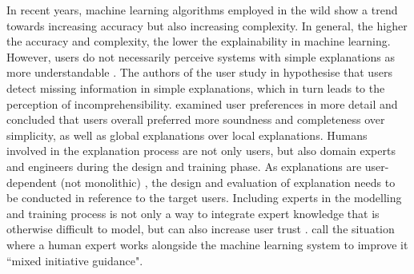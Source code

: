 In recent years, machine learning algorithms employed in the wild show a trend towards increasing accuracy but also increasing complexity. In general, the higher the accuracy and complexity, the lower the explainability \cite{richardson2018survey} \cite{chen2018learning} in machine learning. However, users do not necessarily perceive systems with simple explanations as more understandable \cite{allahyari2011user}. The authors of the user study in \cite{allahyari2011user} hypothesise that users detect missing information in simple explanations, which in turn leads to the perception of incomprehensibility. \cite{van2018contrastive} examined user preferences in more detail and concluded that users overall preferred more soundness and completeness over simplicity, as well as global explanations over local explanations.\newline
Humans involved in the explanation process are not only users, but also domain experts and engineers during the design and training phase. As explanations are user-dependent (not monolithic) \cite{preece2018asking}, the design and evaluation of explanation needs to be conducted in reference to the target users. Including experts in the modelling and training process is not only a way to integrate expert knowledge that is otherwise difficult to model, but can also increase user trust \cite{ventocilla2018taxonomy}. \cite{liu2017towards} call the situation where a human expert works alongside the machine learning system to improve it ``mixed initiative guidance". \newline

